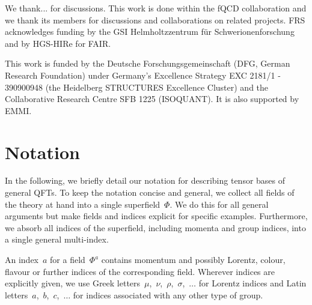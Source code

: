 \documentclass[10pt,prd,nofootinbib,superscriptaddress,twocolumn]{revtex4-2}
\begin{document}
\begin{acknowledgments}
We thank... for discussions. This work is done within the fQCD collaboration \cite{fQCD} and we thank its members for discussions and collaborations on related projects.
FRS acknowledges funding by the GSI Helmholtzzentrum f\"ur Schwerionenforschung and by HGS-HIRe for FAIR.

This work is funded by the Deutsche Forschungsgemeinschaft (DFG, German Research Foundation) under Germany’s Excellence Strategy EXC 2181/1 - 390900948 (the Heidelberg STRUCTURES Excellence Cluster) and the Collaborative Research Centre SFB 1225 (ISOQUANT). It is also supported by EMMI. 
	
	
\end{acknowledgments}

\appendix


\section{Notation}
\label{app:notation}

In the following, we briefly detail our notation for describing tensor bases of general QFTs.
To keep the notation concise and general, we collect all fields of the theory at hand into a single superfield~$\Phi$. 
We do this for all general arguments but make fields and indices explicit for specific examples.
Furthermore, we absorb all indices of the superfield, including momenta and group indices, into a single general multi-index.

An index~$a$ for a field~$\Phi^a$ contains momentum and possibly Lorentz, colour, flavour or further indices of the corresponding field.
Wherever indices are explicitly given, we use Greek letters~$\mu$,~$\nu$,~$\rho$,~$\sigma$,~$\dotsc$ for Lorentz indices and Latin letters~$a$,~$b$,~$c$,~$\dotsc$ for indices associated with any other type of group. 
\end{document}
